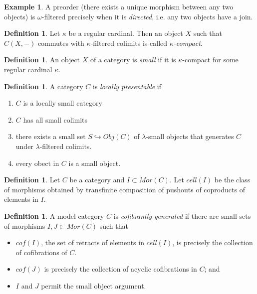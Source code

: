 \documentclass[letterpaper]{article}
\theoremstyle{definition}
\newtheorem{example}[lemma]{Example}
\newtheorem{definition}[lemma]{Definition}
\begin{document}
\begin{example}
A preorder (there exists a unique morphism between any two objects) is
$\omega$-filtered precisely when it is \emph{directed}, i.e. any two objects
have a join.
\end{example}

\begin{definition}
Let $\kappa$ be a regular cardinal. Then an object $X$ such that
$C(X,-)$ commutes with $\kappa$-filtered colimits is called \emph{$\kappa$-compact}.
\end{definition}

\begin{definition}
An object $X$ of a category is \emph{small} if it is $\kappa$-compact
for some regular cardinal $\kappa$.
\end{definition}

\begin{definition}
A category $C$ is \emph{locally presentable} if 
\begin{enumerate}
\item $C$ is a locally small category
\item $C$ has all small colimits
\item there exists a small set $S\hookrightarrow Obj(C)$ of
  $\lambda$-small objects that generates $C$ under $\lambda$-filtered
  colimits.
\item every obect in $C$ is a small object.
\end{enumerate}
\end{definition}

\begin{definition}
Let $C$ be a category and $I \subset Mor(C)$. Let \emph{$cell(I)$} be
  the class of morphisms obtained by transfinite composition of
  pushouts of coproducts of elements in $I$.
\end{definition}

\begin{definition}
A model category $C$ is \emph{cofibrantly generated} if there are
small sets of morphisms $I,J \subset Mor(C)$ such that
\begin{itemize}
\item $cof(I)$, the set of retracts of elements in $cell(I)$, is
  precisely the collection of cofibrations of $C$.
\item $cof(J)$ is precisely the collection of acyclic cofibrations in
  $C$; and
\item $I$ and $J$ permit the small object argument. 
\end{itemize}
\end{definition}
\end{document}
